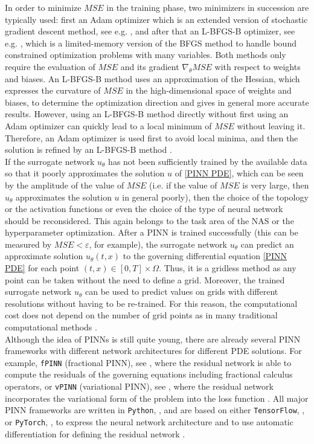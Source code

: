 In order to minimize $MSE$ in the training phase, two minimizers in succession are typically used: first an Adam optimizer which is an extended version of stochastic gradient descent method, see e.g. \cite{KingmaBa:2017}, and after that an L-BFGS-B optimizer, see e.g. \cite{ByrdLuNocedalZhu:1995}, which is a limited-memory version of the BFGS method to handle bound constrained optimization problems with many variables. Both methods only require the evaluation of $MSE$ and its gradient $\nabla_\theta MSE$ with respect to weights and biases. An L-BFGS-B method uses an approximation of the Hessian, which expresses the curvature of $MSE$ in the high-dimensional space of weights and biases, to determine the optimization direction and gives in general more accurate results. However, using an L-BFGS-B method directly without first using an Adam optimizer can quickly lead to a local minimum of $MSE$ without leaving it. Therefore, an Adam optimizer is used first to avoid local minima, and then the solution is refined by an L-BFGS-B method \cite[p.~6]{Markidis:2021}. \\
If the surrogate network $u_\theta$ has not been sufficiently trained by the available data so that it poorly approximates the solution $u$ of \cref{PINN PDE}, which can be seen by the amplitude of the value of $MSE$ (i.e. if the value of $MSE$ is very large, then $u_\theta$ approximates the solution $u$ in general poorly), then the choice of the topology or the activation functions or even the choice of the type of neural network should be reconsidered. This again belongs to the task area of the NAS or the hyperparameter optimization. After a PINN is trained successfully (this can be measured by $MSE < \varepsilon$, for example), the surrogate network $u_\theta$ can predict an approximate solution $u_\theta (t,x)$ to the governing differential equation \cref{PINN PDE} for each point $(t,x) \in \left[ 0, T \right] \times \Omega$. Thus, it is a gridless method as any point can be taken without the need to define a grid. Moreover, the trained surrogate network $u_\theta$ can be used to predict values on grids with different resolutions without having to be re-trained. For this reason, the computational cost does not depend on the number of grid points as in many traditional computational methods \cite[p.~2]{Markidis:2021}. \\
Although the idea of PINNs is still quite young, there are already several PINN frameworks with different network architectures for different PDE solutions. For example, \lstinline!fPINN! (fractional PINN), see \cite{PangLuKarniadakis:2019}, where the residual network is able to compute the residuals of the governing equations including fractional calculus operators, or \lstinline!vPINN! (variational PINN), see \cite{KharazmiZhangKarniadakis:2019}, where the residual network incorporates the variational form of the problem into the loss function \cite[pp.~5-6]{Markidis:2021}. All major PINN frameworks are written in \lstinline!Python!, \cite{Python}, and are based on either \lstinline!TensorFlow!, \cite{TensorFlow}, or \lstinline!PyTorch!, \cite{PyTorch}, to express the neural network architecture and to use automatic differentiation for defining the residual network \cite[p.~6]{Markidis:2021}. 